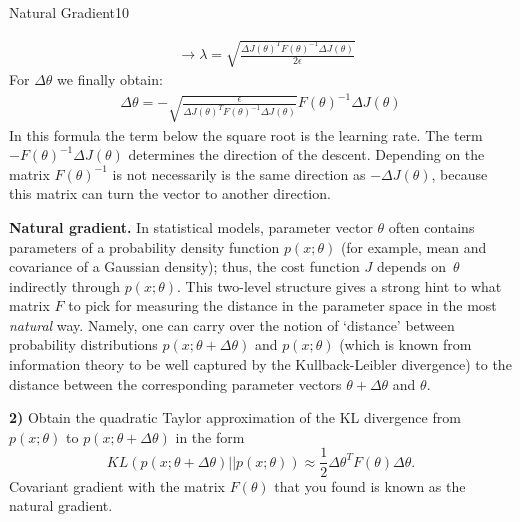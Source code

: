 \begin{questions}
\begin{question}[bonus]{Natural Gradient}{10}
\begin{answer}
\begin{align*}
&\rightarrow \lambda = \sqrt{\frac{\Delta J (\theta)^T F(\theta)^{-1} \Delta J(\theta)}{2 \epsilon}}
\end{align*}
For $\Delta \theta$ we finally obtain:
\begin{align*}
\Delta \theta = - \sqrt{\frac{\epsilon}{\Delta J(\theta)^TF(\theta)^{-1}\Delta J(\theta)}}F(\theta)^{-1}\Delta J(\theta)
\end{align*}
In this formula the term below the square root is the learning rate. The term $-F(\theta)^{-1}\Delta J(\theta)$ determines the direction of the descent. Depending on the matrix $F(\theta)^{-1}$ is not necessarily is the same direction as $-\Delta J(\theta)$, because this matrix can turn the vector to another direction.
\end{answer}
\textbf{Natural gradient.}
In statistical models, parameter vector $\theta$ often
contains parameters of a probability density function $p(x; \theta)$
(for example, mean and covariance of a Gaussian density);
thus, the cost function $J$ depends on~$\theta$ indirectly
through $p(x; \theta)$.
This two-level structure gives a strong hint to what matrix $F$
to pick for measuring the distance in the parameter space
in the most \textit{natural} way.
Namely, one can carry over the notion of `distance' between
probability distributions $p(x; \theta + \Delta \theta)$
and $p(x; \theta)$ (which is known from information theory
to be well captured by the Kullback-Leibler divergence)
to the distance between the corresponding parameter vectors
$\theta + \Delta \theta$ and $\theta$.

\textbf{2)} Obtain the quadratic Taylor approximation
of the KL divergence
from $p(x; \theta)$ to $p(x; \theta + \Delta \theta)$ in the form
\begin{equation*}
  KL(p(x; \theta + \Delta \theta) || p(x; \theta)) \approx
  \frac{1}{2}\Delta \theta^T F(\theta) \Delta \theta.
\end{equation*}
Covariant gradient with the matrix $F(\theta)$ that you found
is known as the natural gradient.

\begin{answer}\end{answer}

\end{question}




\end{questions}
